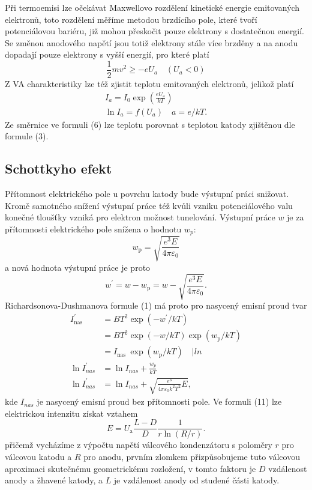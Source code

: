 \documentclass[czech,11pt,a4paper]{article}
\begin{document}
\begin{multicols}{2}
		Při termoemisi lze očekávat Maxwellovo rozdělení kinetické energie emitovaných elektronů, toto rozdělení měříme metodou brzdícího pole, které tvoří potenciálovou bariéru, již mohou přeskočit pouze elektrony s dostatečnou energií. Se změnou anodového napětí jsou totiž elektrony stále více brzděny a na anodu dopadají pouze elektrony s vyšší energií, pro které platí 
		\begin{equation}
			\frac 1 2 m v^2 \geq -eU_a \quad (U_a < 0)
		\end{equation}
		Z VA charakteristiky lze též zjistit teplotu emitovaných elektronů, jelikož platí 
		\begin{gather}
		I_{a}=I_{0} \exp \left(\frac{e U_{\mathrm{a}}}{k T}\right)\\
		\ln I_a = f(U_a) \quad a = e/kT.
		\end{gather}
		Ze směrnice ve formuli (6) lze teplotu porovnat s teplotou katody zjištěnou dle formule (3).
		
		\subsection{Schottkyho efekt}
		Přítomnost elektrického pole u povrchu katody bude výstupní práci snižovat. Kromě samotného snížení výstupní práce též kvůli vzniku potenciálového valu konečné tloušťky vzniká pro elektron možnost tunelování.
		Výstupní práce $w$ je za přítomnosti elektrického pole snížena o hodnotu $w_p$:
		\begin{equation}
			w_{\mathrm{p}}=\sqrt{\frac{e^{3} E}{4 \pi \varepsilon_{0}}}
		\end{equation}
		a nová hodnota výstupní práce je proto
		\begin{equation}
			w^{\prime}=w-w_{\mathrm{p}}=w-\sqrt{\frac{e^{3} E}{4 \pi \varepsilon_{0}}}.
		\end{equation}
		Richardsonova-Dushmanova formule (1) má proto pro nasycený emisní proud tvar
		\begin{align}
			I_{\text {nas }}^{\prime}&=B T^{2} \exp \left(-w^{\prime} / k T\right)\\
			&=B T^{2} \exp (-w / k T) \exp \left(w_{\mathrm{p}} / k T\right)\\
			&=I_{\text {nas }} \exp \left(w_{\mathrm{p}} / k T\right)\quad |ln\\
			\ln I^\prime_{nas} &=\ln I_{nas}+\frac{w_p}{kT}	\\
			\ln I^\prime_{nas} &=\ln I_{nas}+\sqrt{\frac{e^3}{4 \pi \varepsilon_{0} k^2 T^2}E},
		\end{align}
		kde $I_{nas}$ je nasycený emisní proud bez přítomnosti pole. 
		Ve formuli (11) lze elektrickou intenzitu získat vztahem
		\begin{equation}E=U_{\mathrm{a}} \frac{L-D}{D} \frac{1}{r \ln (R / r)} .
		\end{equation} přičemž vycházíme z výpočtu napětí válcového kondenzátoru s poloměry $r$ pro válcovou katodu a $R$ pro anodu, prvním zlomkem přizpůsobujeme tuto válcovou aproximaci skutečnému geometrickému rozložení, v tomto faktoru je $D$ vzdálenost anody a žhavené katody, a $L$ je vzdálenost anody od studené části katody.
		

\end{multicols}
\end{document}
